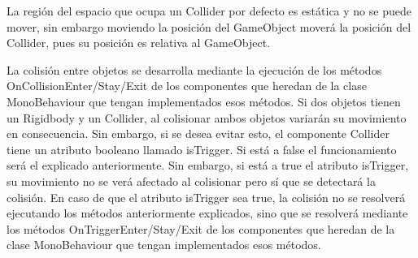 La región del espacio que ocupa un Collider por defecto es estática y no se puede mover, sin embargo moviendo la posición del GameObject moverá la posición del Collider, pues su posición es relativa al GameObject.

La colisión entre objetos se desarrolla mediante la ejecución de los métodos OnCollisionEnter/Stay/Exit de los componentes que heredan de la clase MonoBehaviour que tengan implementados esos métodos. 
Si dos objetos tienen un Rigidbody y un Collider, al colisionar ambos objetos variarán su movimiento en consecuencia. Sin embargo, si se desea evitar esto, el componente Collider tiene un atributo booleano llamado isTrigger. Si está a false el funcionamiento será el explicado anteriormente. Sin embargo, si está a true el atributo isTrigger, su movimiento no se verá afectado al colisionar pero sí que se detectará la colisión. En caso de que el atributo isTrigger sea true, la colisión no se resolverá ejecutando los métodos anteriormente explicados, sino que se resolverá mediante los métodos OnTriggerEnter/Stay/Exit de los componentes que heredan de la clase MonoBehaviour que tengan implementados esos métodos.

